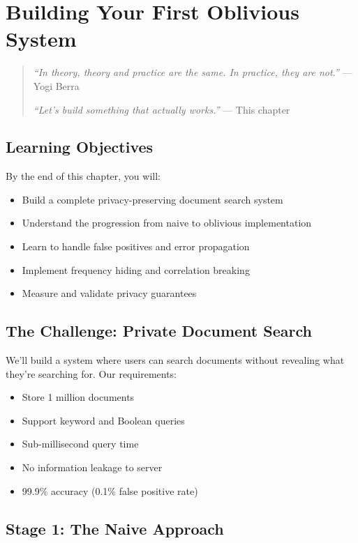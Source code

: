 \chapter{Building Your First Oblivious System}
\label{ch:first-system}

\begin{quote}
\textit{``In theory, theory and practice are the same. In practice, they are not.''} — Yogi Berra

\textit{``Let's build something that actually works.''} — This chapter
\end{quote}

\section*{Learning Objectives}
By the end of this chapter, you will:
\begin{itemize}
\item Build a complete privacy-preserving document search system
\item Understand the progression from naive to oblivious implementation
\item Learn to handle false positives and error propagation
\item Implement frequency hiding and correlation breaking
\item Measure and validate privacy guarantees
\end{itemize}

\section{The Challenge: Private Document Search}

We'll build a system where users can search documents without revealing what they're searching for. Our requirements:

\begin{itemize}
\item Store 1 million documents
\item Support keyword and Boolean queries
\item Sub-millisecond query time
\item No information leakage to server
\item 99.9\% accuracy (0.1\% false positive rate)
\end{itemize}

\section{Stage 1: The Naive Approach}

